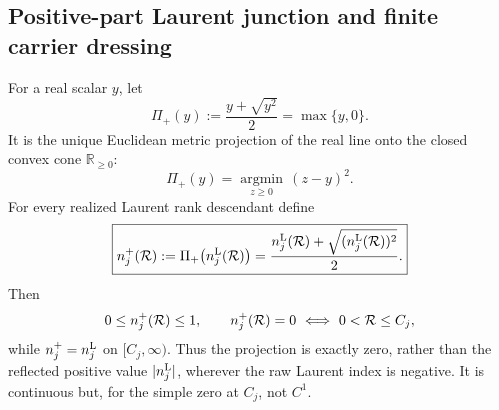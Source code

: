 \documentclass[12pt,a4paper]{article}
\begin{document}
\subsection{Positive-part Laurent junction and finite carrier dressing}
\begin{theorem}
\label{p3d:thm:canonical-nonnegative-laurent-projection}
For a real scalar \(y\), let
\begin{equation}
\label{p3d:eq:positive-part-projector}
 \boxed{
 \Pi_+(y):=\frac{y+\sqrt{y^2}}{2}=\max\{y,0\}.}
\end{equation}
It is the unique Euclidean metric projection of the real line onto the closed
convex cone \(\mathbb R_{\ge0}\):
\[
 \Pi_+(y)=\underset{z\ge0}{\operatorname{argmin}}\,(z-y)^2.
\]
For every realized Laurent rank descendant define
\begin{equation}
\label{p3d:eq:laurent-positive-part-projection}
 \boxed{
 n_j^+(\mathcal R)
 :=\Pi_+\!\left(n_j^{\rm L}(\mathcal R)\right)
 =\frac{n_j^{\rm L}(\mathcal R)
 +\sqrt{(n_j^{\rm L}(\mathcal R))^2}}{2}.}
\end{equation}
Then
\begin{equation}
\label{p3d:eq:nonnegative-laurent-index-properties}
 0\le n_j^+(\mathcal R)\le1,\qquad
 n_j^+(\mathcal R)=0\ \Longleftrightarrow\ 0<\mathcal R\le C_j,
\end{equation}
while \(n_j^+=n_j^{\rm L}\) on \([C_j,\infty)\).  Thus the projection is
exactly zero, rather than the reflected positive value
\(\lvert n_j^{\rm L}\rvert\), wherever the raw Laurent index is negative.
It is continuous but, for the simple zero at \(C_j\), not \(C^1\).


\end{theorem}
\end{document}
